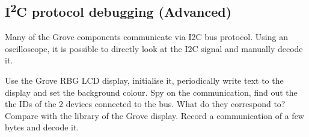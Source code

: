 \subsection{I\textsuperscript{2}C protocol debugging (Advanced)}
Many of the Grove components communicate via \ac{I2C} bus protocol. Using an oscilloscope, it is possible to directly look at the \ac{I2C} signal and manually decode it.
%
\begin{atask}[\ac{I2C} decoding]
  Use the Grove RBG LCD display, initialise it, periodically write text to the display and set the background colour. Spy on the communication, find out the the IDs of the 2 devices connected to the bus. What do they correspond to? Compare with the library of the Grove display. Record a communication of a few bytes and decode it.
\end{atask}

